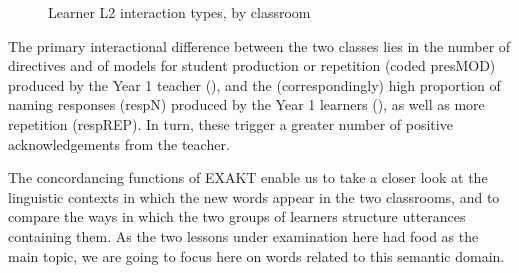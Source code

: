 \documentclass[output=paper,colorlinks,citecolor=brown,modfonts,nonflat]{../langscibook}
\begin{document}
 \begin{figure}
\hspace*{22mm}%

 \caption{\label{fig:hilton:5}Learner L2 interaction types, by classroom}
 \end{figure}

The primary interactional difference between the two classes lies in the number of directives and of models for student production or repetition (coded presMOD) produced by the Year 1 teacher (), and the (correspondingly) high proportion of naming responses (respN) produced by the Year 1 learners (), as well as more repetition (respREP). In turn, these trigger a greater number of positive acknowledgements from the teacher.

The concordancing functions of EXAKT enable us to take a closer look at the linguistic contexts in which the new words appear in the two classrooms, and to compare the ways in which the two groups of learners structure utterances containing them. As the two lessons under examination here had food as the main topic, we are going to focus here on words related to this semantic domain.  
\end{document}
